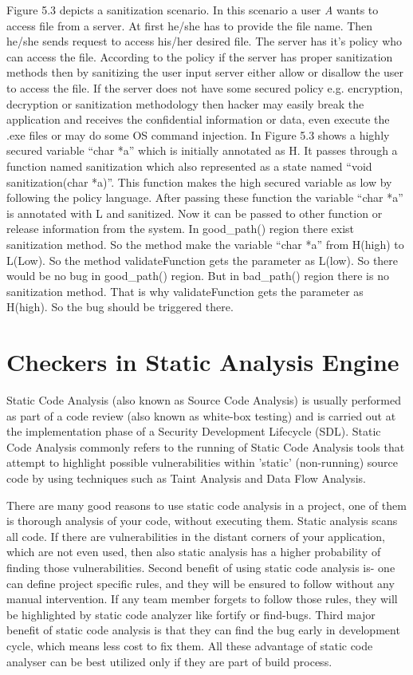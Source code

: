  Figure 5.3 depicts a sanitization scenario. In this scenario a user \emph{A} wants to access file from a server. At first he/she has to provide the file name. Then he/she sends request to access his/her desired file. The server has it's policy who can access the file. According to the policy if the server has proper sanitization methods then by sanitizing the user input server either allow or disallow the user to access the file. If the server does not have some secured policy e.g. encryption, decryption or sanitization methodology then hacker may easily break the application and receives the confidential information or data, even execute the .exe files or may do some OS command injection. In Figure 5.3 shows a highly secured variable \enquote{char *a} which is initially annotated as H. It passes through a function named sanitization which also represented as a state named \enquote{void sanitization(char *a)}. This function makes the high secured variable as low by following the policy language. After passing these function the variable \enquote{char *a} is annotated with L and sanitized. Now it can be passed to other function or release information from the system. In good\_path() region there exist sanitization method. So the method make the variable \enquote{char *a} from H(high) to L(Low). So the method validateFunction gets the parameter as L(low). So there would be no bug in good\_path() region. But in bad\_path() region there is no sanitization method. That is why validateFunction gets the parameter as H(high). So the bug should be triggered there.



\section{Checkers in Static Analysis Engine}

Static Code Analysis (also known as Source Code Analysis) is usually performed as part of a code review (also known as white-box testing) and is carried out at the implementation phase of a Security Development Lifecycle (SDL). Static Code Analysis commonly refers to the running of Static Code Analysis tools that attempt to highlight possible vulnerabilities within 'static' (non-running) source code by using techniques such as Taint Analysis and Data Flow Analysis.

There are many good reasons to use static code analysis in a project, one of them is thorough analysis of your code, without executing them. Static analysis scans all code. If there are vulnerabilities in the distant corners of your application, which are not even used, then also static analysis has a higher probability of finding those vulnerabilities. Second benefit of using static code analysis is- one can define project specific rules, and they will be ensured to follow without any manual intervention. If any team member forgets to follow those rules, they will be highlighted by static code analyzer like fortify or find-bugs. Third major benefit of static code analysis is that they can find the bug early in development cycle, which means less cost to fix them. All these advantage of static code analyser can be best utilized only if they are part of build process.

